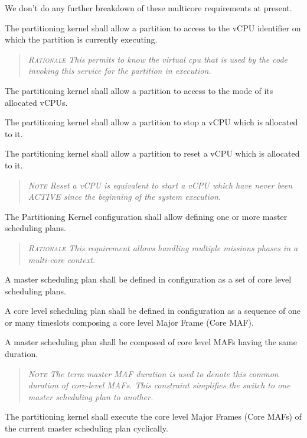 We don't do any further breakdown of these multicore requirements
at present.

The partitioning kernel shall allow a partition to access to the vCPU identifier on which the partition is currently executing.
\begin{quote}\it
\textsc{Rationale}
This permits to know the virtual cpu that is used by the code invoking this service for the partition in execution.
\end{quote}

The partitioning kernel shall allow a partition to access to the mode of its allocated vCPUs.

The partitioning kernel shall allow a partition to stop a vCPU which is allocated to it.

The partitioning kernel shall allow a partition to reset a vCPU which is allocated to it.
\begin{quote}\it
\textsc{Note}
Reset a vCPU is equivalent to start a vCPU which have never been ACTIVE since the beginning of the system execution.
\end{quote}

The Partitioning Kernel configuration shall allow defining one or more master scheduling plans.
\begin{quote}\it
\textsc{Rationale}
This requirement allows handling multiple missions phases in a multi-core context.
\end{quote}

A master scheduling plan shall be defined in configuration as a set of core level scheduling plans.

A core level scheduling plan shall be defined in configuration as a sequence of one or many timeslots composing a core level Major Frame (Core MAF).

A master scheduling plan shall be composed of core level MAFs having the same duration.
\begin{quote}\it
\textsc{Note}
The term master MAF duration is used to denote this common duration of core-level MAFs. This constraint simplifies the switch to one master scheduling plan to another.
\end{quote}

The partitioning kernel shall execute the core level Major Frames (Core MAFs) of the current master scheduling plan cyclically.

